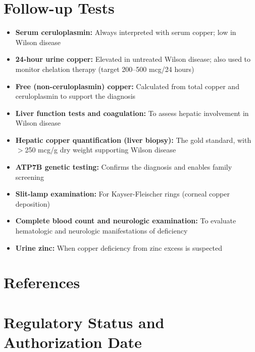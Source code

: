 \section*{Follow-up Tests}
\begin{itemize}
  \item \textbf{Serum ceruloplasmin:} Always interpreted with serum copper; low in Wilson disease
  \item \textbf{24-hour urine copper:} Elevated in untreated Wilson disease; also used to monitor chelation therapy (target 200--500 mcg/24 hours)
  \item \textbf{Free (non-ceruloplasmin) copper:} Calculated from total copper and ceruloplasmin to support the diagnosis
  \item \textbf{Liver function tests and coagulation:} To assess hepatic involvement in Wilson disease
  \item \textbf{Hepatic copper quantification (liver biopsy):} The gold standard, with $>$250 mcg/g dry weight supporting Wilson disease
  \item \textbf{ATP7B genetic testing:} Confirms the diagnosis and enables family screening
  \item \textbf{Slit-lamp examination:} For Kayser-Fleischer rings (corneal copper deposition)
  \item \textbf{Complete blood count and neurologic examination:} To evaluate hematologic and neurologic manifestations of deficiency
  \item \textbf{Urine zinc:} When copper deficiency from zinc excess is suspected
\end{itemize}

\section*{References}



\clearpage
\section*{Regulatory Status and Authorization Date}

\clearpage
